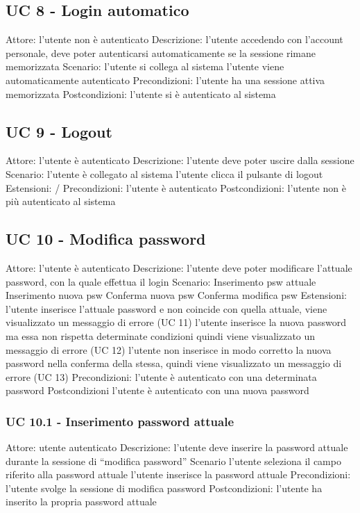 \subsection{UC 8 - Login automatico}
Attore: l’utente non è autenticato 
Descrizione: l’utente accedendo con l’account personale, deve poter autenticarsi automaticamente se la sessione rimane memorizzata
Scenario:
l’utente si collega al sistema 
l’utente viene automaticamente autenticato 
Precondizioni: l’utente ha una sessione attiva memorizzata
Postcondizioni: l’utente si è autenticato al sistema

\subsection{UC 9 - Logout}
Attore: l’utente è autenticato 
Descrizione: l’utente deve poter uscire dalla sessione
Scenario:
l’utente è collegato al sistema
l’utente clicca il pulsante di logout
Estensioni: /
Precondizioni: l’utente è autenticato
Postcondizioni: l’utente non è più autenticato al sistema

\subsection{UC 10 - Modifica password}
Attore: l’utente è autenticato
Descrizione: l’utente deve poter modificare l’attuale password, con la quale effettua il login
Scenario:
Inserimento psw attuale
Inserimento nuova psw
Conferma nuova psw
Conferma modifica psw
Estensioni: 
l’utente inserisce l’attuale password e non coincide con quella attuale, viene visualizzato un messaggio di errore (UC 11)
l’utente inserisce la nuova password ma essa non rispetta determinate condizioni quindi viene visualizzato un messaggio di errore (UC 12)
l’utente non inserisce in modo corretto la nuova password nella conferma della stessa, quindi viene visualizzato un messaggio di errore (UC 13)
Precondizioni: l’utente è autenticato con una determinata password
Postcondizioni l’utente è autenticato con una nuova password

\subsubsection{UC 10.1 - Inserimento password attuale} 
Attore: utente autenticato
Descrizione: l’utente deve inserire la password attuale durante la sessione di “modifica password”
Scenario
l’utente seleziona il campo riferito alla password attuale
l’utente inserisce la password attuale
Precondizioni: l’utente svolge la sessione di modifica password
Postcondizioni: l’utente ha inserito la propria password attuale

